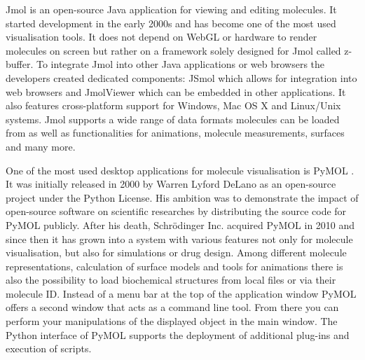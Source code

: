 Jmol \cite{BibEntry2022Mar} is an open-source Java application for viewing and editing molecules. It started development in the early 2000s and has become one of the most used visualisation tools. It does not depend on WebGL or hardware to render molecules on screen but rather on a framework solely designed for Jmol called z-buffer. To integrate Jmol into other Java applications or web browsers the developers created dedicated components: JSmol which allows for integration into web browsers and JmolViewer which can be embedded in other applications. It also features cross-platform support for Windows, Mac OS X and Linux/Unix systems. Jmol supports a wide range of data formats molecules can be loaded from as well as functionalities for animations, molecule measurements, surfaces and many more.

One of the most used desktop applications for molecule visualisation is PyMOL \cite{PyMOL}. It was initially released in 2000 by Warren Lyford DeLano as an open-source project under the Python License. His ambition was to demonstrate the impact of open-source software on scientific researches by distributing the source code for PyMOL publicly. After his death, Schrödinger Inc. acquired PyMOL in 2010 and since then it has grown into a system with various features not only for molecule visualisation, but also for simulations or drug design. Among different molecule representations, calculation of surface models and tools for animations there is also the possibility to load biochemical structures from local files or via their molecule ID. Instead of a menu bar at the top of the application window PyMOL offers a second window that acts as a command line tool. From there you can perform your manipulations of the displayed object in the main window. The Python interface of PyMOL supports the deployment of additional plug-ins and execution of scripts.
